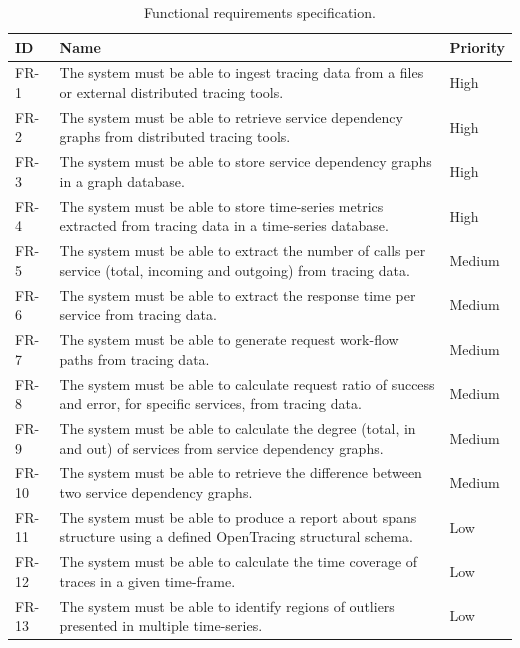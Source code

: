 \begin{table}[H]
    \caption{Functional requirements specification.}
    \label{table:functional_requirements_specification}
    \centering
    \begin{tabularx}{\linewidth} {
            |>{\hsize=0.10\hsize}X|
            >{\hsize=0.75\hsize}X|
            >{\hsize=0.15\hsize}X|}
        \cline{1-3}
         \textbf{ID}
         & \textbf{Name}
         & \textbf{Priority}                                                                                                                                                                                  \\ \hline \hline
         FR-1
         & The system must be able to ingest tracing data from a files or external distributed tracing tools.
         & High \\ \hline
         FR-2
         & The system must be able to retrieve service dependency graphs from distributed tracing tools.
         & High \\ \hline
         FR-3
         & The system must be able to store service dependency graphs in a graph database.
         & High \\ \hline
         FR-4
         & The system must be able to store time-series metrics extracted from tracing data in a time-series database.
         & High \\ \hline
         FR-5
         & The system must be able to extract the number of calls per service (total, incoming and outgoing) from tracing data.
         & Medium \\ \hline
         FR-6
         & The system must be able to extract the response time per service from tracing data.
         & Medium \\ \hline
         FR-7
         & The system must be able to generate request work-flow paths from tracing data.
         & Medium \\ \hline
         FR-8
         & The system must be able to calculate request ratio of success and error, for specific services, from tracing data.
         & Medium \\ \hline
         FR-9
         & The system must be able to calculate the degree (total, in and out) of services from service dependency graphs.
         & Medium \\ \hline
         FR-10
         & The system must be able to retrieve the difference between two service dependency graphs.
         & Medium \\ \hline
         FR-11
         & The system must be able to produce a report about spans structure using a defined OpenTracing structural schema.
         & Low \\ \hline
         FR-12
         & The system must be able to calculate the time coverage of traces in a given time-frame.
         & Low \\ \hline
         FR-13
         & The system must be able to identify regions of outliers presented in multiple time-series.
         & Low \\ \hline
    \end{tabularx}
\end{table}

